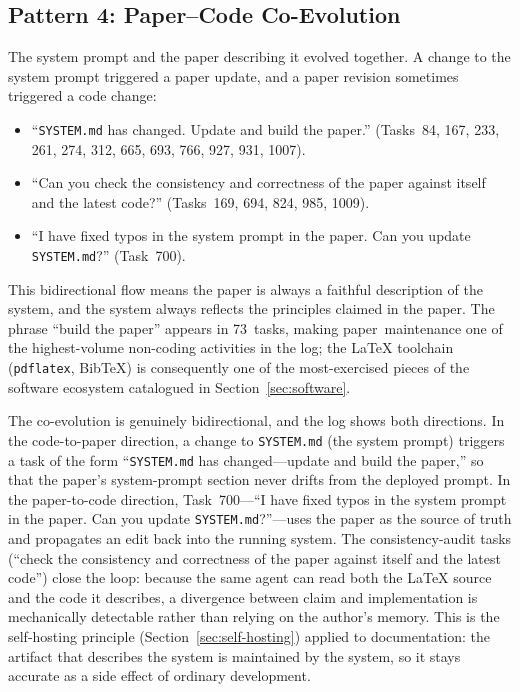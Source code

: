 \documentclass{article}
\begin{document}
\subsection{Pattern 4: Paper--Code Co-Evolution}
\label{sec:p-paper}

The system prompt and the paper describing it evolved together.
A change to the system prompt triggered a paper update, and a paper
revision sometimes triggered a code change:

\begin{itemize}[nosep]
  \item ``\texttt{SYSTEM.md} has changed.  Update and build the paper.''
        (Tasks~84, 167, 233, 261, 274, 312, 665, 693, 766, 927, 931, 1007).
  \item ``Can you check the consistency and correctness of the paper
        against itself and the latest code?''
        (Tasks~169, 694, 824, 985, 1009).
  \item ``I have fixed typos in the system prompt in the paper.
        Can you update \texttt{SYSTEM.md}?''
        (Task~700).
\end{itemize}

This bidirectional flow means the paper is always a faithful
description of the system, and the system always reflects the
principles claimed in the paper.
The phrase ``build the paper'' appears in 73~tasks, making
paper~maintenance one of the highest-volume non-coding activities in
the log; the \LaTeX{} toolchain (\texttt{pdflatex}, BibTeX) is
consequently one of the most-exercised pieces of the software
ecosystem catalogued in Section~\ref{sec:software}.

The co-evolution is genuinely bidirectional, and the log shows both
directions.
In the code-to-paper direction, a change to \texttt{SYSTEM.md} (the
system prompt) triggers a task of the form ``\texttt{SYSTEM.md} has
changed---update and build the paper,'' so that the paper's system-prompt
section never drifts from the deployed prompt.
In the paper-to-code direction, Task~700---``I have fixed typos in the
system prompt in the paper.  Can you update \texttt{SYSTEM.md}?''---uses
the paper as the source of truth and propagates an edit back into the
running system.
The consistency-audit tasks (``check the consistency and correctness
of the paper against itself and the latest code'') close the loop:
because the same agent can read both the \LaTeX{} source and the code
it describes, a divergence between claim and implementation is
mechanically detectable rather than relying on the author's memory.
This is the self-hosting principle (Section~\ref{sec:self-hosting})
applied to documentation: the artifact that describes the system is
maintained by the system, so it stays accurate as a side effect of
ordinary development.
\end{document}
